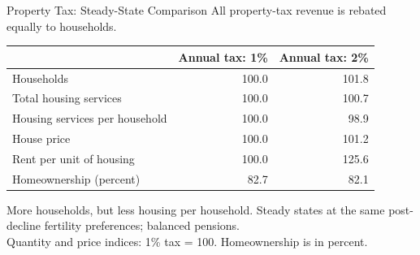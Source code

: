 \documentclass[11pt,aspectratio=169]{beamer}
\begin{document}
\begin{frame}{Property Tax: Steady-State Comparison}
All property-tax revenue is rebated equally to households.
\par\medskip
\renewcommand{\arraystretch}{1.15}
\begin{tabularx}{\textwidth}{@{}Xrr@{}}
\toprule
 & Annual tax: 1\% & Annual tax: 2\% \\
\midrule
Households & 100.0 & 101.8 \\
Total housing services & 100.0 & 100.7 \\
Housing services per household & 100.0 & 98.9 \\
House price & 100.0 & 101.2 \\
Rent per unit of housing & 100.0 & 125.6 \\
Homeownership (percent) & 82.7 & 82.1 \\
\bottomrule
\end{tabularx}
\par\medskip
More households, but less housing per household.
\vfill
{\footnotesize Steady states at the same post-decline fertility preferences; balanced pensions.\\
Quantity and price indices: 1\% tax = 100. Homeownership is in percent.}
\end{frame}
\end{document}
